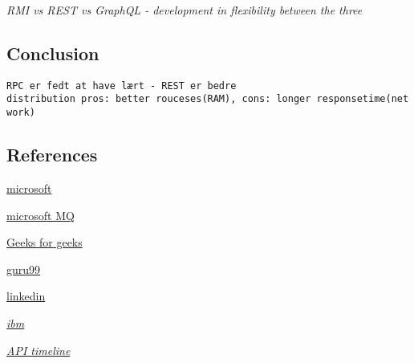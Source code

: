 \documentclass[
]{article}
\begin{document}
\emph{RMI vs REST vs GraphQL - development in flexibility between the
three}

\hypertarget{conclusion}{%
\subsection{Conclusion}\label{conclusion}}

\texttt{RPC\ er\ fedt\ at\ have\ lært\ -\ REST\ er\ bedre}
\texttt{distribution\ pros:\ better\ rouceses(RAM),\ cons:\ longer\ responsetime(network)}

\hypertarget{references}{%
\subsection{References}\label{references}}

\href{https://docs.microsoft.com/en-us/openspecs/windows_protocols/ms-tsgu/76796f19-9e6f-48b9-8b8f-4ef9f197056b\#gt_8a7f6700-8311-45bc-af10-82e10accd331}{microsoft}

\href{https://docs.microsoft.com/da-dk/windows/win32/rpc/using-msmq-as-an-rpc-transport}{microsoft
MQ}

\href{https://www.geeksforgeeks.org/remote-procedure-call-rpc-in-operating-system/}{Geeks
for geeks}

\href{https://www.guru99.com/remote-procedure-call-rpc.html}{guru99}

\href{https://www.linkedin.com/pulse/rest-vs-rpc-soa-showdown-joshua-hartman/}{linkedin}

\emph{\href{https://www.ibm.com/support/knowledgecenter/ssw_aix_71/commprogramming/ch8_rpc.html}{ibm}}

\emph{\href{https://www.altexsoft.com/blog/soap-vs-rest-vs-graphql-vs-rpc/}{API
timeline}}
\end{document}
